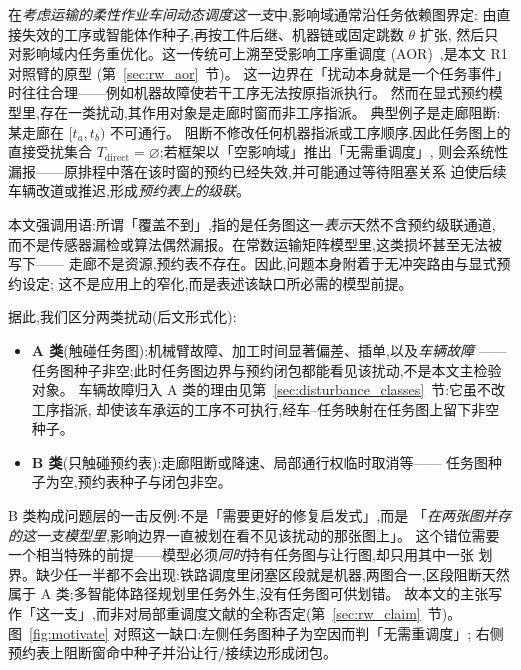 \documentclass[manuscript,screen,review]{acmart}
\begin{document}
在\emph{考虑运输的柔性作业车间动态调度这一支}中,影响域通常沿任务依赖图界定:
由直接失效的工序或智能体作种子,再按工件后继、机器链或固定跳数 \(\theta\) 扩张,
然后只对影响域内任务重优化。这一传统可上溯至受影响工序重调度
(AOR)~\cite{abumaizar1997rescheduling},是本文 R1 对照臂的原型
(第~\ref{sec:rw_aor}~节)。
这一边界在「扰动本身就是一个任务事件」时往往合理——例如机器故障使若干工序无法按原指派执行。
然而在显式预约模型里,存在一类扰动,其作用对象是走廊时窗而非工序指派。
典型例子是走廊阻断:某走廊在 \([t_a,t_b)\) 不可通行。
阻断不修改任何机器指派或工序顺序,因此任务图上的直接受扰集合
\(T_{\mathrm{direct}}=\varnothing\);若框架以「空影响域」推出「无需重调度」,
则会系统性漏报——原排程中落在该时窗的预约已经失效,并可能通过等待阻塞关系
迫使后续车辆改道或推迟,形成\emph{预约表上的级联}。

本文强调用语:所谓「覆盖不到」,指的是任务图这一\emph{表示}天然不含预约级联通道,
而不是传感器漏检或算法偶然漏报。在常数运输矩阵模型里,这类损坏甚至无法被写下——
走廊不是资源,预约表不存在。因此,问题本身附着于无冲突路由与显式预约设定;
这不是应用上的窄化,而是表述该缺口所必需的模型前提。

据此,我们区分两类扰动(后文形式化):
\begin{itemize}[leftmargin=1.5em,itemsep=0.25em]
\item \textbf{A 类}(触碰任务图):机械臂故障、加工时间显著偏差、插单,以及\emph{车辆故障}
——任务图种子非空;此时任务图边界与预约闭包都能看见该扰动,不是本文主检验对象。
车辆故障归入 A 类的理由见第~\ref{sec:disturbance_classes}~节:它虽不改工序指派,
却使该车承运的工序不可执行,经车--任务映射在任务图上留下非空种子。
\item \textbf{B 类}(只触碰预约表):走廊阻断或降速、局部通行权临时取消等——
任务图种子为空,预约表种子与闭包非空。
\end{itemize}
B 类构成问题层的一击反例:不是「需要更好的修复启发式」,而是
「\emph{在两张图并存的这一支模型里},影响边界一直被划在看不见该扰动的那张图上」。
这个错位需要一个相当特殊的前提——模型必须\emph{同时}持有任务图与让行图,却只用其中一张
划界。缺少任一半都不会出现:铁路调度里闭塞区段就是机器,两图合一,区段阻断天然属于
A 类;多智能体路径规划里任务外生,没有任务图可供划错。
故本文的主张写作「这一支」,而非对局部重调度文献的全称否定(第~\ref{sec:rw_claim}~节)。
图~\ref{fig:motivate} 对照这一缺口:左侧任务图种子为空因而判「无需重调度」;
右侧预约表上阻断窗命中种子并沿让行/接续边形成闭包。
\end{document}
